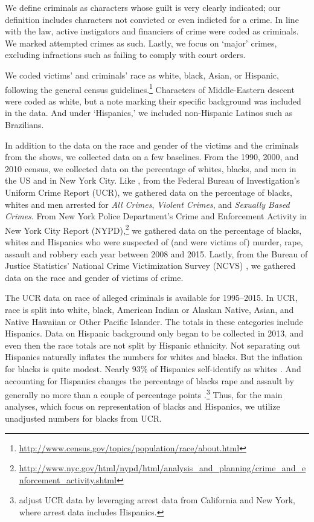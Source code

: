 \documentclass[12pt, letterpaper]{article}
\begin{document}
We define criminals as characters whose guilt is very clearly indicated; our definition includes characters not convicted or even indicted for a crime. In line with the law, active instigators and financiers of crime were coded as criminals. We marked attempted crimes as such. Lastly, we focus on `major' crimes, excluding infractions such as failing to comply with court orders. 

We coded victims' and criminals' race as white, black, Asian, or Hispanic, following the general census guidelines.\footnote{\url{http://www.census.gov/topics/population/race/about.html}} Characters of Middle-Eastern descent were coded as white, but a note marking their specific background was included in the data. And under `Hispanics,' we included non-Hispanic Latinos such as Brazilians.

In addition to the data on the race and gender of the victims and the criminals from the shows, we collected data on a few baselines. From the 1990, 2000, and 2010 census, we collected data on the percentage of whites, blacks, and men in the US and in New York City. Like \citet{dixon2000overrepresentation}, from the Federal Bureau of Investigation's Uniform Crime Report (UCR), we gathered data on the percentage of blacks, whites and men arrested for \textit{All Crimes}, \textit{Violent Crimes}, and \textit{Sexually Based Crimes}. From New York Police Department's Crime and Enforcement Activity in New York City Report (NYPD),\footnote{\url{http://www.nyc.gov/html/nypd/html/analysis_and_planning/crime_and_enforcement_activity.shtml}} we gathered data on the percentage of blacks, whites and Hispanics who were suspected of (and were victims of) murder, rape, assault and robbery each year between 2008 and 2015. Lastly, from the Bureau of Justice Statistics' National Crime Victimization Survey (NCVS) \citep{powers2016national, victimization1998national}, we gathered data on the race and gender of victims of crime.  

The UCR data on race of alleged criminals is available for 1995--2015. In UCR, race is split into white, black, American Indian or Alaskan Native, Asian, and Native Hawaiian or Other Pacific Islander. The totals in these categories include Hispanics. Data on Hispanic background only began to be collected in 2013, and even then the race totals are not split by Hispanic ethnicity. Not separating out Hispanics naturally inflates the numbers for whites and blacks. But the inflation for blacks is quite modest. Nearly 93\% of Hispanics self-identify as whites \citep{steffensmeier2011reassessing}. And accounting for Hispanics changes the percentage of blacks rape and assault by generally no more than a couple of percentage points \citep[see figure 4,][]{steffensmeier2011reassessing}.\footnote{\citet{steffensmeier2011reassessing} adjust UCR data by leveraging arrest data from California and New York, where arrest data includes Hispanics.} Thus, for the main analyses, which focus on representation of blacks and Hispanics, we utilize unadjusted numbers for blacks from UCR.
\end{document}
